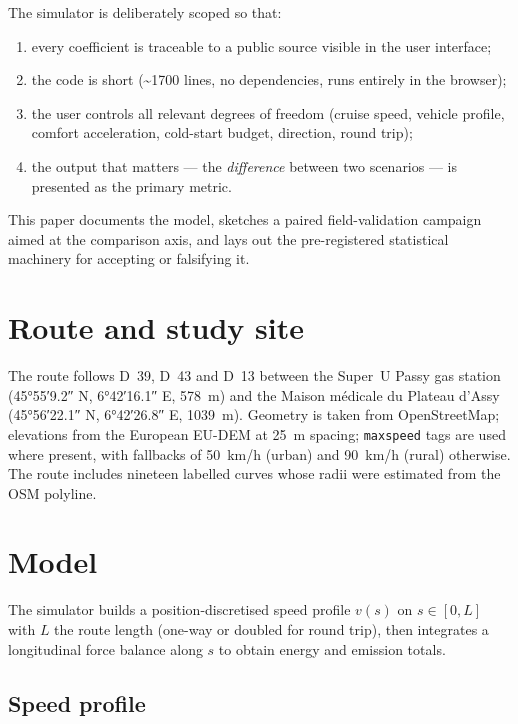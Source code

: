 \documentclass[11pt,a4paper]{article}
\begin{document}
The simulator is deliberately scoped so that:

\begin{enumerate}
  \item every coefficient is traceable to a public source visible
        in the user interface;
  \item the code is short (\textasciitilde\num{1700} lines, no
        dependencies, runs entirely in the browser);
  \item the user controls all relevant degrees of freedom (cruise
        speed, vehicle profile, comfort acceleration, cold-start
        budget, direction, round trip);
  \item the output that matters --- the \emph{difference} between
        two scenarios --- is presented as the primary metric.
\end{enumerate}

This paper documents the model, sketches a paired field-validation
campaign aimed at the comparison axis, and lays out the
pre-registered statistical machinery for accepting or falsifying it.

\section{Route and study site}

The route follows D~39, D~43 and D~13 between the Super~U Passy
gas station (\ang{45;55;9.2} N, \ang{6;42;16.1} E, \SI{578}{m}) and
the Maison m\'edicale du Plateau d'Assy (\ang{45;56;22.1} N,
\ang{6;42;26.8} E, \SI{1039}{m}). Geometry is taken from
OpenStreetMap; elevations from the European EU-DEM at \SI{25}{m}
spacing; \texttt{maxspeed} tags are used where present, with
fallbacks of \SI{50}{km/h} (urban) and \SI{90}{km/h} (rural)
otherwise. The route includes nineteen labelled curves whose radii
were estimated from the OSM polyline.

\section{Model}

The simulator builds a position-discretised speed profile
$v(s)$ on $s \in [0, L]$ with $L$ the route length (one-way or doubled
for round trip), then integrates a longitudinal force balance
\cite{liu2017} along $s$ to obtain energy and emission totals.

\subsection{Speed profile}
\end{document}
